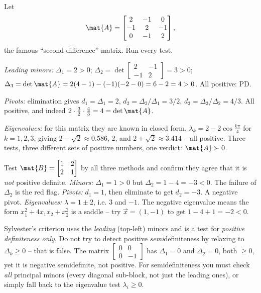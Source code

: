\begin{example}
\label{ch27:ex-allthree}
Let
\[
  \mat{A} = \begin{bmatrix} 2 & -1 & 0 \\ -1 & 2 & -1 \\ 0 & -1 & 2 \end{bmatrix},
\]
the famous ``second difference'' matrix. Run every test.

\emph{Leading minors:} $\Delta_1 = 2 > 0$; $\Delta_2 = \det\begin{bmatrix}2&-1\\-1&2\end{bmatrix}
= 3 > 0$; $\Delta_3 = \det\mat{A} = 2(4-1) - (-1)(-2-0) = 6 - 2 = 4 > 0$. All positive: PD.

\emph{Pivots:} elimination gives $d_1 = \Delta_1 = 2$, $d_2 = \Delta_2/\Delta_1 = 3/2$, $d_3 =
\Delta_3/\Delta_2 = 4/3$. All positive, and indeed $2 \cdot \tfrac32 \cdot \tfrac43 = 4 = \det\mat{A}$.

\emph{Eigenvalues:} for this matrix they are known in closed form, $\lambda_k = 2 - 2\cos\frac{k\pi}{4}$
for $k=1,2,3$, giving $2-\sqrt2 \approx 0.586$, $2$, and $2+\sqrt2 \approx 3.414$ -- all positive.
Three tests, three different sets of positive numbers, one verdict: $\mat{A}\succ 0$.
\end{example}

\begin{labbox}
Test $\mat{B} = \begin{bmatrix} 1 & 2 \\ 2 & 1 \end{bmatrix}$ by all three methods and confirm they
agree that it is \emph{not} positive definite.
\emph{Minors:} $\Delta_1 = 1 > 0$ but $\Delta_2 = 1 - 4 = -3 < 0$. The failure of $\Delta_2$ is the
red flag.
\emph{Pivots:} $d_1 = 1$, then eliminate to get $d_2 = -3$. A negative pivot.
\emph{Eigenvalues:} $\lambda = 1 \pm 2$, i.e. $3$ and $-1$. The negative eigenvalue means the form
$x_1^2 + 4x_1x_2 + x_2^2$ is a saddle -- try $\vec{x}=(1,-1)$ to get $1 - 4 + 1 = -2 < 0$.
\end{labbox}

\begin{trapbox}
Sylvester's criterion uses the \emph{leading} (top-left) minors and is a test for \emph{positive
definiteness only}. Do not try to detect positive \emph{semi}definiteness by relaxing to
$\Delta_k \geq 0$ -- that is false. The matrix $\begin{bmatrix} 0 & 0 \\ 0 & -1\end{bmatrix}$ has
$\Delta_1 = 0$ and $\Delta_2 = 0$, both $\geq 0$, yet it is negative semidefinite, not positive. For
semidefiniteness you must check \emph{all} principal minors (every diagonal sub-block, not just the
leading ones), or simply fall back to the eigenvalue test $\lambda_i \geq 0$.
\end{trapbox}

